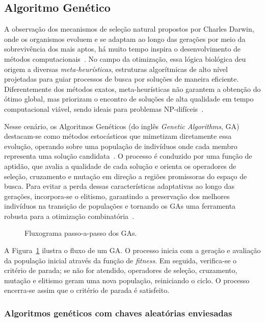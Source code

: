 \subsection{Algoritmo Genético}

A observação dos mecanismos de seleção natural propostos por Charles Darwin, onde os organismos evoluem e se adaptam ao longo das gerações por meio da sobrevivência dos mais aptos, há muito tempo inspira o desenvolvimento de métodos computacionais~\cite{Sivanandam2007}. No campo da otimização, essa lógica biológica deu origem a diversas \emph{meta-heurísticas}, estruturas algorítmicas de alto nível projetadas para guiar processos de busca por soluções de maneira eficiente. Diferentemente dos métodos exatos, meta-heurísticas não garantem a obtenção do ótimo global, mas priorizam o encontro de soluções de alta qualidade em tempo computacional viável, sendo ideais para problemas NP-difíceis~\cite{Metaheuristics}.

Nesse cenário, os Algoritmos Genéticos (do inglês \emph{Genetic Algorithms}, GA) destacam-se como métodos estocásticos que mimetizam diretamente essa evolução, operando sobre uma população de indivíduos onde cada membro representa uma solução candidata~\cite{Sivanandam2007}. O processo é conduzido por uma função de aptidão, que avalia a qualidade de cada solução e orienta os operadores de seleção, cruzamento e mutação em direção a regiões promissoras do espaço de busca. Para evitar a perda dessas características adaptativas ao longo das gerações, incorpora-se o elitismo, garantindo a preservação dos melhores indivíduos na transição de populações e tornando os GAs uma ferramenta robusta para a otimização combinatória~\cite{Khandelwal2021,Aggarwal2024,Raju2024}.


    \begin{figure}[H]
        \centering
        \scalebox{0.55}{\fluxograma}
        \caption{Fluxograma passo-a-passo dos GAs.}
        \label{fig:fluxograma_ga}
    \end{figure}

    A Figura~\ref{fig:fluxograma_ga} ilustra o fluxo de um GA. O processo inicia com a geração e avaliação da população inicial através da função de \emph{fitness}. Em seguida, verifica-se o critério de parada; se não for atendido, operadores de seleção, cruzamento, mutação e elitismo geram uma nova população, reiniciando o ciclo. O processo encerra-se assim que o critério de parada é satisfeito.

\subsubsection{Algoritmos genéticos com chaves aleatórias enviesadas}
   
